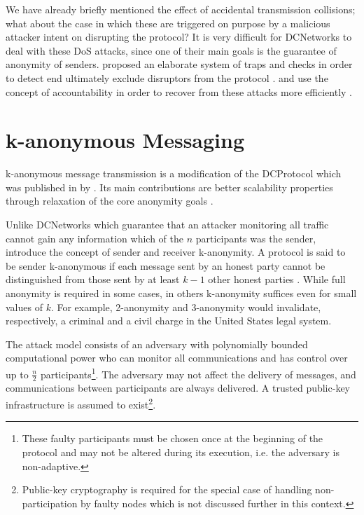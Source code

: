 We have already briefly mentioned the effect of accidental transmission collisions; what about the
case in which these are triggered on purpose by a malicious attacker intent on disrupting the
protocol? It is very difficult for \acp{DCNetwork} to deal with these \ac{DoS} attacks,
since one of their main goals is the guarantee of anonymity of senders. \citeauthor{journals/joc/Chaum88}
proposed an elaborate system of traps and checks in order to detect end ultimately exclude
disruptors from the protocol \cite{journals/joc/Chaum88}. \Dissent and \Verdict use the concept of
accountability in order to recover from these attacks more efficiently \cite{journals/corr/abs-1004-3057,corrigan2013proactively}.

\section{k-anonymous Messaging}


k-anonymous message transmission is a modification of the \ac{DCProtocol} which was published in \citeyear{von2003k} by \citeauthor{von2003k}. Its main contributions are better scalability properties through relaxation
of the core anonymity goals \cite{von2003k}.

Unlike \acp{DCNetwork} which guarantee that an attacker monitoring all traffic cannot gain
any information which of the $n$ participants was the sender, \citeauthor{von2003k} introduce
the concept of sender and receiver k-anonymity. A protocol is said to be sender k-anonymous
if each message sent by an honest party cannot be distinguished from those sent by at least $k - 1$
other honest parties \cite{von2003k}. While full anonymity is required in some cases, in others
k-anonymity suffices even for small values of $k$. For example, 2-anonymity and 3-anonymity would invalidate, respectively, a criminal and a civil charge in the United States legal system.

The attack model consists of an adversary with polynomially bounded computational power
who can monitor all communications and
has control over up to $\frac{n}{2}$ participants\footnote{
These faulty participants must be chosen once at the beginning of the protocol and may not
be altered during its execution, i.e. the adversary is non-adaptive.}. The adversary may not affect
the delivery of messages, and communications between participants are always delivered.
A trusted public-key infrastructure is assumed to exist\footnote{Public-key cryptography is
required for the special case of handling non-participation by faulty nodes which is not discussed further
in this context.}.

